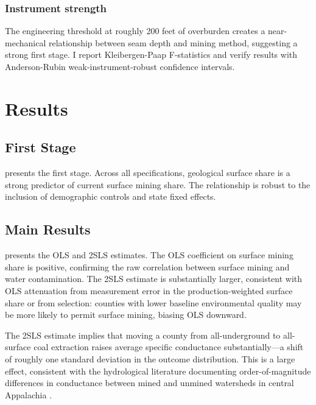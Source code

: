 \documentclass[12pt]{article}
\begin{document}
\subsubsection*{Instrument strength} The engineering threshold at roughly 200 feet of overburden creates a near-mechanical relationship between seam depth and mining method, suggesting a strong first stage. I report Kleibergen-Paap F-statistics and verify results with Anderson-Rubin weak-instrument-robust confidence intervals.


\section{Results}
\label{sec:results}

\subsection{First Stage}



 presents the first stage. Across all specifications, geological surface share is a strong predictor of current surface mining share. The relationship is robust to the inclusion of demographic controls and state fixed effects.

\subsection{Main Results}



 presents the OLS and 2SLS estimates. The OLS coefficient on surface mining share is positive, confirming the raw correlation between surface mining and water contamination. The 2SLS estimate is substantially larger, consistent with OLS attenuation from measurement error in the production-weighted surface share or from selection: counties with lower baseline environmental quality may be more likely to permit surface mining, biasing OLS downward.

The 2SLS estimate implies that moving a county from all-underground to all-surface coal extraction raises average specific conductance substantially---a shift of roughly one standard deviation in the outcome distribution. This is a large effect, consistent with the hydrological literature documenting order-of-magnitude differences in conductance between mined and unmined watersheds in central Appalachia \citep{pond2010patterns, bernhardt2012synthetic}.
\end{document}
